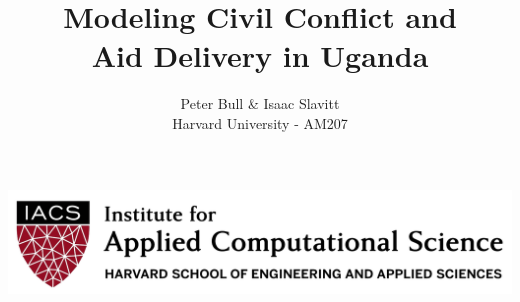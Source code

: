\documentclass[a0,final]{a0poster}
\title{Modeling Civil Conflict and \\Aid Delivery in Uganda}
\author{Peter Bull \& Isaac Slavitt\\
Harvard University - AM207}
\begin{document}
\hspace{-3cm}								%
\colorbox{boxcol}{						%
\begin{minipage}{600mm}
\maketitle
\end{minipage}
\begin{minipage}{575mm}					%
\includegraphics[width=1\textwidth,right]{iacs_logo.png}
\end{minipage}}

\vspace{1cm}
\end{document}
